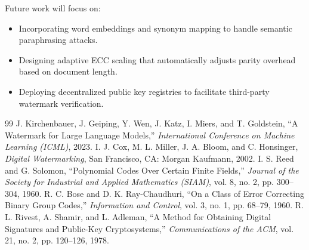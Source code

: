 \documentclass[conference]{IEEEtran}
\begin{document}
Future work will focus on:
\begin{itemize}
    \item Incorporating word embeddings and synonym mapping to handle semantic paraphrasing attacks.
    \item Designing adaptive ECC scaling that automatically adjusts parity overhead based on document length.
    \item Deploying decentralized public key registries to facilitate third-party watermark verification.
\end{itemize}

\begin{thebibliography}{99}
 J. Kirchenbauer, J. Geiping, Y. Wen, J. Katz, I. Miers, and T. Goldstein, ``A Watermark for Large Language Models,'' \emph{International Conference on Machine Learning (ICML)}, 2023.
 I. J. Cox, M. L. Miller, J. A. Bloom, and C. Honsinger, \emph{Digital Watermarking}, San Francisco, CA: Morgan Kaufmann, 2002.
 I. S. Reed and G. Solomon, ``Polynomial Codes Over Certain Finite Fields,'' \emph{Journal of the Society for Industrial and Applied Mathematics (SIAM)}, vol. 8, no. 2, pp. 300--304, 1960.
 R. C. Bose and D. K. Ray-Chaudhuri, ``On a Class of Error Correcting Binary Group Codes,'' \emph{Information and Control}, vol. 3, no. 1, pp. 68--79, 1960.
 R. L. Rivest, A. Shamir, and L. Adleman, ``A Method for Obtaining Digital Signatures and Public-Key Cryptosystems,'' \emph{Communications of the ACM}, vol. 21, no. 2, pp. 120--126, 1978.
\end{thebibliography}
\end{document}

